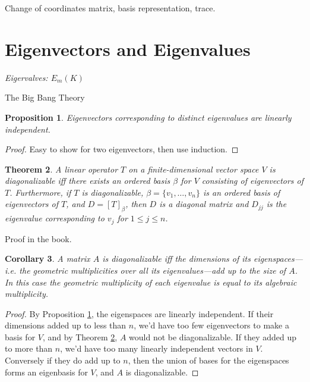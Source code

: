 \documentclass[12pt]{article}
\theoremstyle{plain}
\newtheorem{theorem}{Theorem}
\newtheorem{corollary}[theorem]{Corollary}
\newtheorem{proposition}[theorem]{Proposition}
\theoremstyle{definition}
\theoremstyle{remark}
\begin{document}
Change of coordinates matrix, basis representation, trace.

\part{Eigenvectors and Eigenvalues}

\epigraph{\textit{Eigervalves: $E_m(K)$}}{The Big Bang Theory}

\begin{proposition}\label{eigenindependence}
Eigenvectors corresponding to distinct eigenvalues are linearly independent.
\end{proposition}

\begin{proof}
Easy to show for two eigenvectors, then use induction.
\end{proof}

\begin{mdframed}
\begin{theorem}\label{diagonalizable}
A linear operator $T$ on a finite-dimensional vector space $V$ is diagonalizable iff there exists an ordered basis $\beta$ for $V$ consisting of eigenvectors of $T$. Furthermore, if $T$ is diagonalizable, $\beta = \{v_1,\ldots, v_n\}$ is an ordered basis of eigenvectors of $T$, and $D = [T]_\beta$, then $D$ is a diagonal matrix and $D_{jj}$ is the eigenvalue corresponding to $v_j$ for $1 \leq j \leq n$.
\end{theorem}
\end{mdframed}

Proof in the book.

\begin{corollary}
A matrix $A$ is diagonalizable iff the dimensions of its eigenspaces---i.e. the geometric multiplicities over all its eigenvalues---add up to the size of $A$. In this case the geometric multiplicity of each eigenvalue is equal to its algebraic multiplicity.
\end{corollary}

\begin{proof}
By Proposition \ref{eigenindependence}, the eigenspaces are linearly independent. If their dimensions added up to less than $n$, we'd have too few eigenvectors to make a basis for $V$, and by Theorem \ref{diagonalizable}, $A$ would not be diagonalizable. If they added up to more than $n$, we'd have too many linearly independent vectors in $V$. Conversely if they do add up to $n$, then the union of bases for the eigenspaces forms an eigenbasis for $V$, and $A$ is diagonalizable. 
\end{proof}
\end{document}
